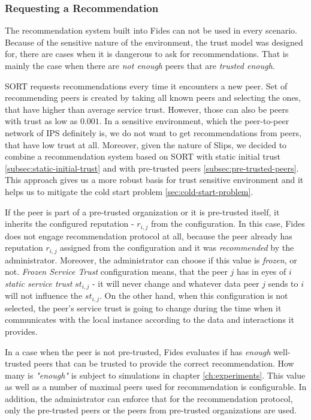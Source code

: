 \subsubsection{Requesting a Recommendation}
\label{subsubsec:requesting-recommendation}
The recommendation system built into Fides can not be used in every scenario.
Because of the sensitive nature of the environment, the trust model was designed for, there are cases when it is dangerous to ask for recommendations.
That is mainly the case when there are \textit{not enough} peers that are \textit{trusted enough}.

SORT \cite{sort} requests recommendations every time it encounters a new peer. Set of recommending peers is created by taking all known peers and selecting the ones, that have higher than average service trust.
However, those can also be peers with trust as low as $0.001$. In a sensitive environment, which the peer-to-peer network of IPS definitely is, we do not want to get recommendations from peers, that have low trust at all.
Moreover, given the nature of Slips, we decided to combine a recommendation system based on SORT with static initial trust \ref{subsec:static-initial-trust} and with pre-trusted peers \ref{subsec:pre-trusted-peers}.
This approach gives us a more robust basis for trust sensitive environment and it helps us to mitigate the cold start problem \ref{sec:cold-start-problem}.

If the peer is part of a pre-trusted organization or it is pre-trusted itself, it inherits the configured reputation - $r_{i, j}$ from the configuration.
In this case, Fides does not engage recommendation protocol at all, because the peer already has reputation $r_{i,j}$ assigned from the configuration and it was \textit{recommended} by the administrator.
Moreover, the administrator can choose if this value is \textit{frozen}, or not. 
\textit{Frozen Service Trust} configuration means, that the peer $j$ has in eyes of $i$ \textit{static service trust} $st_{i, j}$ - it will never change and whatever data peer $j$ sends to $i$ will not influence the $st_{i,j}$.
On the other hand, when this configuration is not selected, the peer's service trust is going to change during the time when it communicates with the local instance according to the data and interactions it provides.

In a case when the peer is not pre-trusted, Fides evaluates if has \textit{enough} well-trusted peers that can be trusted to provide the correct recommendation. How many is \textit{"enough"} is subject to simulations in chapter \ref{ch:experiments}. This value as well as a number of maximal peers used for recommendation is configurable.
In addition, the administrator can enforce that for the recommendation protocol, only the pre-trusted peers or the peers from pre-trusted organizations are used.

